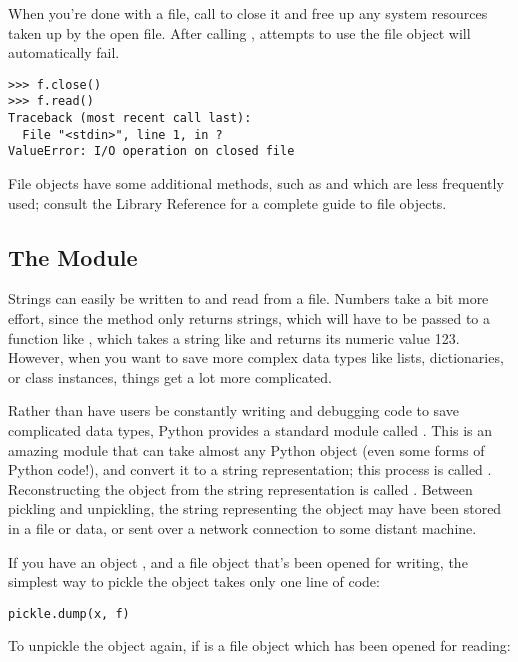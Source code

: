 \documentclass{manual}
\begin{document}
When you're done with a file, call  to close it and
free up any system resources taken up by the open file.  After calling
, attempts to use the file object will automatically fail.

\begin{verbatim}
>>> f.close()
>>> f.read()
Traceback (most recent call last):
  File "<stdin>", line 1, in ?
ValueError: I/O operation on closed file
\end{verbatim}

File objects have some additional methods, such as
 and  which are less frequently
used; consult the Library Reference for a complete guide to file
objects.

\subsection{The  Module \label{pickle}}

Strings can easily be written to and read from a file. Numbers take a
bit more effort, since the  method only returns
strings, which will have to be passed to a function like
, which takes a string like  and
returns its numeric value 123.  However, when you want to save more
complex data types like lists, dictionaries, or class instances,
things get a lot more complicated.

Rather than have users be constantly writing and debugging code to
save complicated data types, Python provides a standard module called
.  This is an
amazing module that can take almost
any Python object (even some forms of Python code!), and convert it to
a string representation; this process is called .  
Reconstructing the object from the string representation is called
.  Between pickling and unpickling, the string
representing the object may have been stored in a file or data, or
sent over a network connection to some distant machine.

If you have an object , and a file object  that's been
opened for writing, the simplest way to pickle the object takes only
one line of code:

\begin{verbatim}
pickle.dump(x, f)
\end{verbatim}

To unpickle the object again, if  is a file object which has
been opened for reading:
\end{document}
